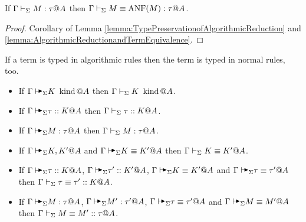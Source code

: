 \begin{corollary}
    \label{corollary:ANFandTermEquivalence}
    If \( \Gamma \vdash_\Sigma M : \tau @ A \) then \( \Gamma \vdash_\Sigma M \equiv \text{ANF}(M) : \tau @ A\).
\end{corollary}
\begin{proof}
    Corollary of Lemma \ref{lemma:TypePreservationofAlgorithmicReduction} and
    \ref{lemma:AlgorithmicReductionandTermEquivalence}.
\end{proof}

\begin{theorem}
    If a term is typed in algorithmic rules then the term is typed in normal rules, too.
    \begin{itemize}
        \item If \(\G\AVS K \iskind @ A \) then \(\Gamma\vdash_\Sigma K \operatorname{\ kind} @A \).
        \item If \(\G\AVS \tau :: K @ A \) then \(\Gamma\vdash_\Sigma \tau ::K  @ A \).
        \item If \(\G\AVS M:\tau @ A \) then \(\Gamma\vdash_\Sigma M:\tau @ A \).
        \item If \(\G\AVS K,K' @ A\) and \(\G\AVS K\E K' @ A \) then \(\Gamma\vdash_\Sigma K\equiv K' @ A \).
        \item If \( \G \AVS \tau :: K @ A \), \( \G \AVS \tau' :: K' @ A \), \( \G \AVS K \E K' @ A\) and \(\G\AVS \tau \E \tau' @ A \) then \(\Gamma\vdash_\Sigma \tau \equiv \tau' :: K @ A \).
        \item If \(\G \AVS M : \tau @ A\), \( \G \AVS M' : \tau' @ A \), \( \G \AVS \tau \E \tau' @ A\) and \(\G\AVS M\E M' @ A \) then \(\Gamma\vdash_\Sigma M\equiv M' :: \tau @ A \).
    \end{itemize}
\end{theorem}

